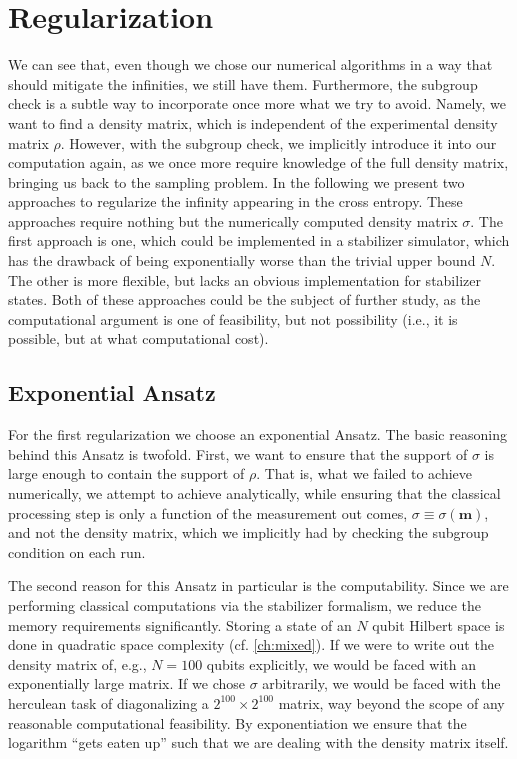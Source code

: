 \section{Regularization}
We can see that, even though we chose our numerical algorithms in a way that
should mitigate the infinities, we still have them. Furthermore, the subgroup
check is a subtle way to incorporate once more what we try to avoid. Namely,
we want to find a density matrix, which is independent of the experimental
density matrix $\rho$. However, with the subgroup check, we implicitly
introduce it into our computation again, as we once more require knowledge of
the full density matrix, bringing us back to the sampling problem. In the
following we present two approaches to regularize the infinity appearing in the
cross entropy. These approaches require nothing but the numerically computed
density matrix $\sigma$. The first approach is one, which could be implemented
in a stabilizer simulator, which has the drawback of being exponentially worse
than the trivial upper bound $N$. The other is more flexible, but lacks an
obvious implementation for stabilizer states. Both of these approaches could be
the subject of further study, as the computational argument is one of
feasibility, but not possibility (i.e., it is possible, but at what
computational cost).

\subsection{Exponential Ansatz}
For the first regularization we choose an exponential Ansatz. The basic reasoning
behind this Ansatz is twofold. First, we want to ensure that the support of
$\sigma$ is large enough to contain the support of $\rho$. That is, what we
failed to achieve numerically, we attempt to achieve analytically, while
ensuring that the classical processing step is only a function of the
measurement out comes, $\sigma \equiv \sigma(\mathbf{m})$, and not the density
matrix, which we implicitly had by checking the subgroup condition on each run.

The second reason for this Ansatz in particular is the computability. Since we
are performing classical computations via the stabilizer formalism, we reduce
the memory requirements significantly. Storing a state of an $N$ qubit Hilbert
space is done in quadratic space complexity (cf. \cref{ch:mixed}). If we were
to write out the density matrix of, e.g., $N=100$ qubits explicitly, we would
be faced with an exponentially large matrix. If we chose $\sigma$ arbitrarily,
we would be faced with the herculean task of diagonalizing a $2^{100} \times
2^{100}$ matrix, way beyond the scope of any reasonable computational
feasibility. By exponentiation we ensure that the logarithm \enquote{gets eaten
up} such that we are dealing with the density matrix itself. 

